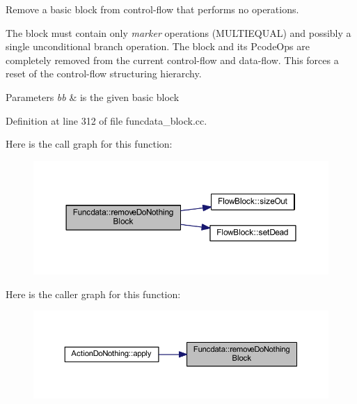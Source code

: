 Remove a basic block from control-\/flow that performs no operations. 

The block must contain only {\itshape marker} operations (M\+U\+L\+T\+I\+E\+Q\+U\+AL) and possibly a single unconditional branch operation. The block and its Pcode\+Ops are completely removed from the current control-\/flow and data-\/flow. This forces a reset of the control-\/flow structuring hierarchy. 
\begin{DoxyParams}{Parameters}
{\em bb} & is the given basic block \\
\hline
\end{DoxyParams}


Definition at line 312 of file funcdata\+\_\+block.\+cc.

Here is the call graph for this function\+:
\nopagebreak
\begin{figure}[H]
\begin{center}
\leavevmode
\includegraphics[width=350pt]{class_funcdata_aa486c5f0556919686a9fdad4ebc2dcc1_cgraph}
\end{center}
\end{figure}
Here is the caller graph for this function\+:
\nopagebreak
\begin{figure}[H]
\begin{center}
\leavevmode
\includegraphics[width=350pt]{class_funcdata_aa486c5f0556919686a9fdad4ebc2dcc1_icgraph}
\end{center}
\end{figure}
\mbox{\label{class_funcdata_af83619924b5d0fed25d0563b0f243262}} 
